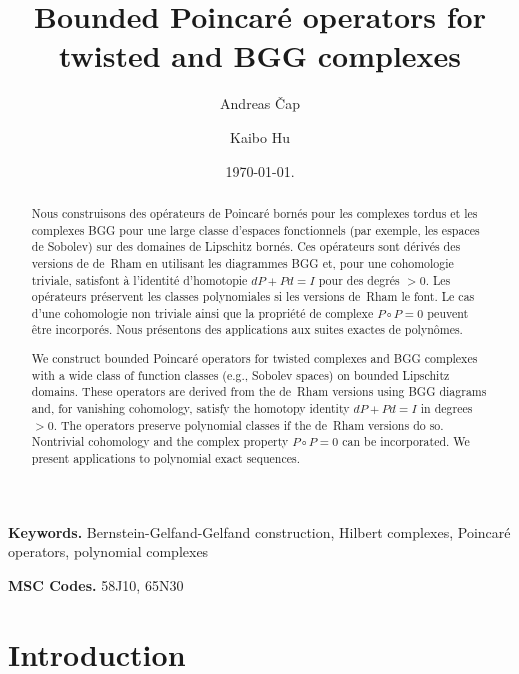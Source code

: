 \documentclass[11pt]{amsart}
\newcommand{\0}{\mathaccent23}
\begin{document}
\title{Bounded Poincar\'e operators for twisted and BGG complexes}

\author{Andreas \v{C}ap \and  Kaibo Hu}
\address{Faculty of Mathematics, University of Vienna, Oskar-Morgenstern-Platz 1, 1090 Wien, Austria}
 \address{Mathematical Institute,
University of Oxford, Andrew Wiles Building, Radcliffe Observatory Quarter, 
Oxford, OX2 6GG, UK}
\date{\today.}
\maketitle

\begin{abstract}
Nous construisons des opérateurs de Poincaré bornés pour les complexes tordus et les complexes BGG pour une large classe d'espaces fonctionnels (par exemple, les espaces de Sobolev) sur des domaines de Lipschitz bornés. Ces opérateurs sont dérivés des versions de de~Rham en utilisant les diagrammes BGG et, pour une cohomologie triviale, satisfont à l'identité d'homotopie $dP+Pd=I$ pour des degrés $>0$. Les opérateurs préservent les classes polynomiales si les versions de~Rham le font. Le cas d'une cohomologie non triviale ainsi que la propriété de complexe $P\circ P=0$ peuvent être incorporés. Nous présentons des applications aux suites exactes de polynômes.
\end{abstract}


\begin{abstract}
We construct bounded Poincar\'e operators for twisted complexes and BGG complexes with a wide class of function classes (e.g., Sobolev spaces) on bounded Lipschitz domains. These operators are derived from the de~Rham versions using BGG diagrams and, for vanishing cohomology, satisfy the homotopy identity $dP+Pd=I$  in degrees $>0$. The operators preserve polynomial classes if the de~Rham versions do so. Nontrivial cohomology and the complex property $P\circ P=0$ can be incorporated. We present applications to polynomial exact sequences.
\end{abstract}
\smallskip
\noindent \textbf{Keywords.} Bernstein-Gelfand-Gelfand construction, Hilbert complexes, Poincar\'e operators, polynomial complexes

\noindent \textbf{MSC Codes.} 58J10, 65N30


\section{Introduction}
\end{document}

